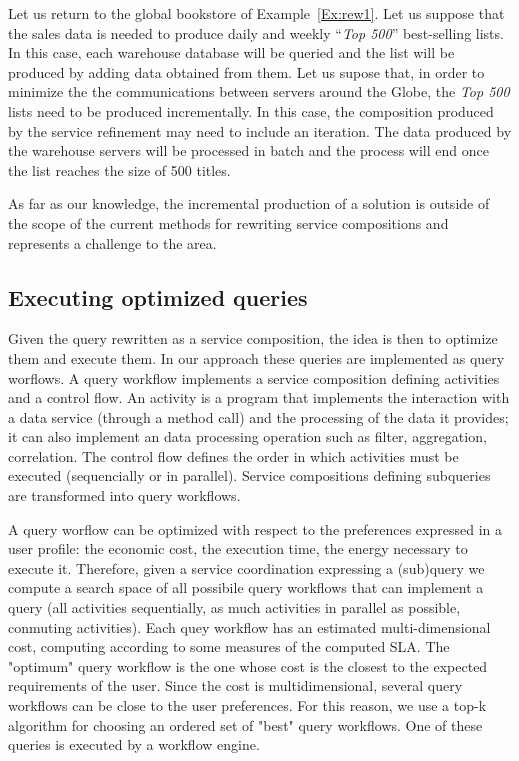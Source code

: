 \begin{example}\label{Ex:rew2}
Let us return to the global bookstore of Example~\ref{Ex:rew1}.
Let us suppose that the sales data is needed to produce daily and weekly ``\textit{Top 500}'' best-selling lists.
In this case, each warehouse database will be queried and the list will be produced by adding data obtained from them.
Let us supose that, in order to minimize the the communications between servers around the Globe, the \textit{Top 500} lists need to be produced incrementally.
In this case, the composition produced by the service refinement may need to include an iteration. The data produced by the warehouse servers will be processed in batch and the process will end once the list reaches the size of 500 titles.

As far as our knowledge, the incremental production of a solution is outside of the scope of the current methods for rewriting service compositions and represents a challenge to the area.
~\hfill\openbox
\end{example}


\subsection{Executing optimized queries}
\label{sec:queryOpt}
Given the query rewritten as a service composition, the idea is then to optimize them and execute them. In our approach these queries are implemented as query worflows. A query workflow implements a service composition defining activities and a control flow. An activity is a program that implements the interaction with a data service (through a method call) and the processing of the data it provides; it can also implement an data processing operation such as filter, aggregation, correlation. The control flow defines the order in which activities must be executed (sequencially or in parallel). Service compositions defining subqueries are transformed into query workflows.

A query worflow can be optimized with respect to the preferences expressed in a user profile: the economic cost, the execution time, the energy necessary to execute it. Therefore, given a service coordination expressing a (sub)query we compute a search space of all possibile query workflows that can implement a query (all activities sequentially, as much activities in parallel as possible, conmuting activities). Each quey workflow has an estimated multi-dimensional cost, computing according to some measures of the computed SLA. The "optimum" query workflow is the one whose cost is the closest to the expected requirements of the user. Since the cost is multidimensional, several query workflows can be close to the user preferences. For this reason, we use a top-k algorithm for choosing an ordered set of "best" query workflows. One of these queries is executed by a workflow engine.


